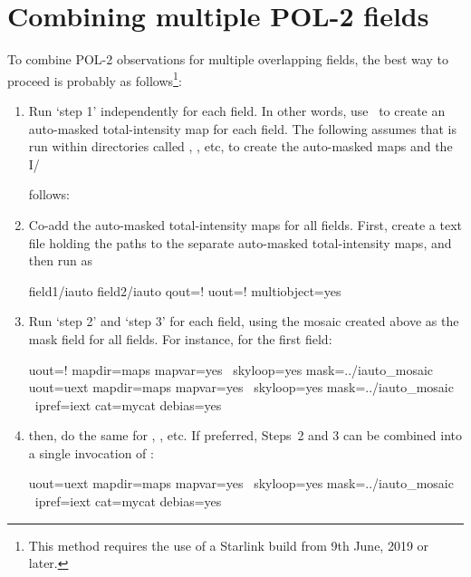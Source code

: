 \section{Combining multiple POL-2 fields}

To combine POL-2 observations for multiple overlapping fields, the best way to proceed is probably as follows\footnote{This method requires the use of a Starlink build from 9th June, 2019 or later.}:

\begin{enumerate}
Q/U time-stream data for each field.
\item Run `step 1' independently for each field. In other words, use \poltwomap\ to create an 
auto-masked total-intensity map for each field. The following assumes that  is run 
within directories called , , etc, to create the auto-masked maps and the I/

follows:
\item Co-add the auto-masked total-intensity maps for all fields. First, create a text file holding 
the paths to the separate auto-masked total-intensity maps, and then run  as 

\begin{terminalv}
        field1/iauto
        field2/iauto
                  qout=! uout=! multiobject=yes
\end{terminalv}

\item Run `step 2' and `step 3' for each field, using the mosaic created above as the mask field 
for all fields. For instance, for the first field:

\begin{terminalv}
                  uout=! mapdir=maps mapvar=yes \
                  skyloop=yes mask=../iauto_mosaic 
                  uout=uext mapdir=maps mapvar=yes \
                  skyloop=yes mask=../iauto_mosaic \
                  ipref=iext cat=mycat debias=yes
\end{terminalv}

\item then, do the same for \file{field2}, , etc. If preferred, Steps~2 and 3 can be 
combined into a single invocation of :

\begin{terminalv}
                  uout=uext mapdir=maps mapvar=yes \
                  skyloop=yes mask=../iauto_mosaic \
                  ipref=iext cat=mycat debias=yes
\end{terminalv}


\end{enumerate}
